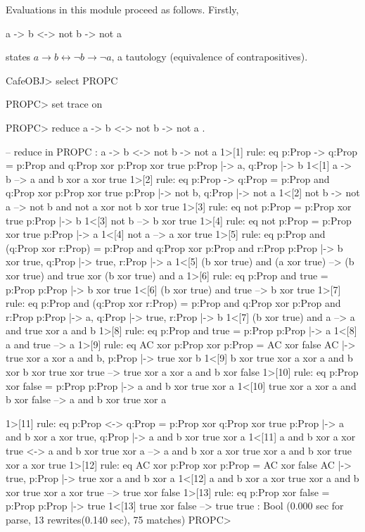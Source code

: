 \documentclass[a4paper]{memoir}
\begin{document}
Evaluations in this module proceed as follows. Firstly,
\begin{vvtm}
\begin{ccode}
  a -> b <-> not b -> not a
\end{ccode}
\end{vvtm}
states $a \to b \leftrightarrow \neg b \to \neg a$, a tautology
(equivalence of contrapositives).
\begin{vvtm}
\begin{ccode}
  CafeOBJ> select PROPC

  PROPC> set trace on

  PROPC> reduce a -> b <-> not b -> not a .

  -- reduce in PROPC : a -> b <-> not b -> not a
  1>[1] rule: eq p:Prop -> q:Prop = p:Prop and q:Prop xor p:Prop xor
         true
      { p:Prop |-> a, q:Prop |-> b }
  1<[1] a -> b --> a and b xor a xor true
  1>[2] rule: eq p:Prop -> q:Prop = p:Prop and q:Prop xor p:Prop xor
         true
      { p:Prop |-> not b, q:Prop |-> not a }
  1<[2] not b -> not a --> not b and not a xor not b xor true
  1>[3] rule: eq not p:Prop = p:Prop xor true
      { p:Prop |-> b }
  1<[3] not b --> b xor true
  1>[4] rule: eq not p:Prop = p:Prop xor true
      { p:Prop |-> a }
  1<[4] not a --> a xor true
  1>[5] rule: eq p:Prop and (q:Prop xor r:Prop) = p:Prop and q:Prop 
        xor p:Prop and r:Prop
      { p:Prop |-> b xor true, q:Prop |-> true, r:Prop |-> a }
  1<[5] (b xor true) and (a xor true) --> (b xor true) and true xor
       (b xor true) and a
  1>[6] rule: eq p:Prop and true = p:Prop
      { p:Prop |-> b xor true }
  1<[6] (b xor true) and true --> b xor true
  1>[7] rule: eq p:Prop and (q:Prop xor r:Prop) = p:Prop and q:Prop 
        xor p:Prop and r:Prop
      { p:Prop |-> a, q:Prop |-> true, r:Prop |-> b }
  1<[7] (b xor true) and a --> a and true xor a and b
  1>[8] rule: eq p:Prop and true = p:Prop
      { p:Prop |-> a }
  1<[8] a and true --> a
  1>[9] rule: eq AC xor p:Prop xor p:Prop = AC xor false
      { AC |-> true xor a xor a and b, p:Prop |-> true xor b }
  1<[9] b xor true xor a xor a and b xor b xor true xor true --> true 
      xor a xor a and b xor false
  1>[10] rule: eq p:Prop xor false = p:Prop
      { p:Prop |-> a and b xor true xor a }
  1<[10] true xor a xor a and b xor false --> a and b xor true xor a
    \end{ccode}
  \end{vvtm}
\begin{vvtm}
\begin{ccode}
  1>[11] rule: eq p:Prop <-> q:Prop = p:Prop xor q:Prop xor true
      { p:Prop |-> a and b xor a xor true, q:Prop |-> a and b xor true 
         xor a }
  1<[11] a and b xor a xor true <-> a and b xor true xor a --> a and
       b xor a xor true xor a and b xor true xor a xor true
  1>[12] rule: eq AC xor p:Prop xor p:Prop = AC xor false
      { AC |-> true, p:Prop |-> true xor a and b xor a }
  1<[12] a and b xor a xor true xor a and b xor true xor a xor true
       --> true xor false
  1>[13] rule: eq p:Prop xor false = p:Prop
      { p:Prop |-> true }
  1<[13] true xor false --> true
  true : Bool
  (0.000 sec for parse, 13 rewrites(0.140 sec), 75 matches)
  PROPC> 
\end{ccode}
\end{vvtm}
\end{document}
